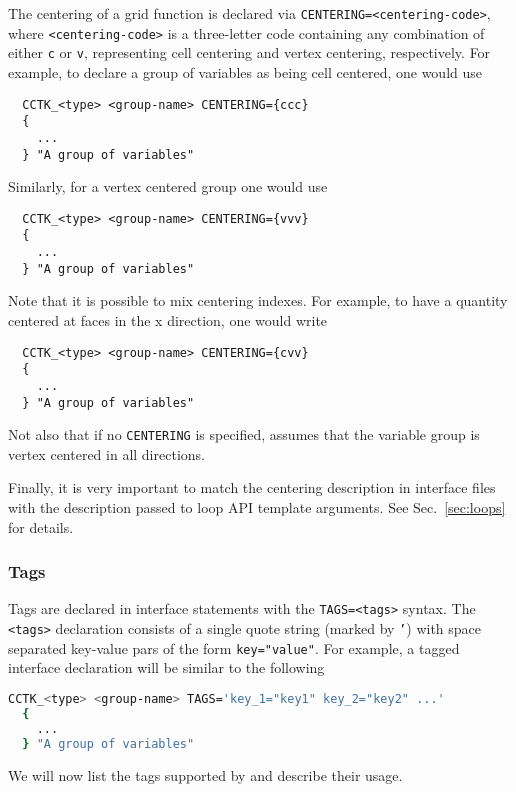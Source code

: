 The centering of a grid function is declared via \texttt{CENTERING={<centering-code>}}, where \texttt{<centering-code>} is a three-letter code containing any combination of either \texttt{c} or \texttt{v}, representing cell centering and vertex centering, respectively. For example, to declare a group of variables as being cell centered, one would use
%
\begin{lstlisting}
  CCTK_<type> <group-name> CENTERING={ccc}
  {
    ...
  } "A group of variables"
\end{lstlisting}

Similarly, for a vertex centered group one would use
%
\begin{lstlisting}
  CCTK_<type> <group-name> CENTERING={vvv}
  {
    ...
  } "A group of variables"
\end{lstlisting}

Note that it is possible to mix centering indexes. For example, to have a quantity centered at faces in the x direction, one would write
%
\begin{lstlisting}
  CCTK_<type> <group-name> CENTERING={cvv}
  {
    ...
  } "A group of variables"
\end{lstlisting}

Not also that if no \texttt{CENTERING} is specified, \CarpetX\space assumes that the variable group is vertex centered in all directions.

Finally, it is very important to match the centering description in interface files with the description passed to loop API template arguments. See Sec.~\ref{sec:loops} for details.

\subsubsection{Tags}

Tags are declared in interface statements with the \texttt{TAGS=<tags>} syntax. The \texttt{<tags>} declaration consists of a single quote string (marked by \texttt{'}) with space separated key-value pars of the form \texttt{key="value"}. For example, a tagged interface declaration will be similar to the following
%
\begin{lstlisting}[language=bash]
  CCTK_<type> <group-name> TAGS='key_1="key1" key_2="key2" ...'
  {
    ...
  } "A group of variables"
\end{lstlisting}

We will now list the tags supported by \CarpetX\space and describe their usage.

